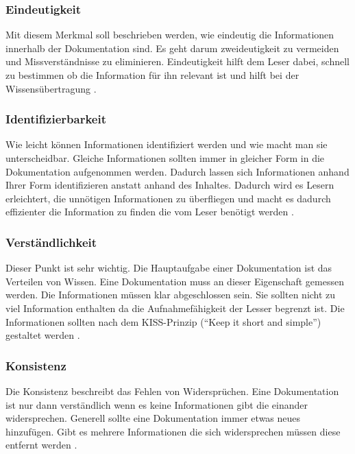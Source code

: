 \documentclass[a4paper,12pt]{scrartcl}
\begin{document}
\subsubsection{Eindeutigkeit}
Mit diesem Merkmal soll beschrieben werden, wie eindeutig die Informationen innerhalb der Dokumentation sind. Es geht darum zweideutigkeit zu vermeiden und Missverständnisse zu eliminieren. Eindeutigkeit hilft dem Leser dabei, schnell zu bestimmen ob die Information für ihn relevant ist und hilft bei der Wissensübertragung \cite{Prause2013}.

\subsubsection{Identifizierbarkeit}
Wie leicht können Informationen identifiziert werden und wie macht man sie unterscheidbar. Gleiche Informationen sollten immer in gleicher Form in die Dokumentation aufgenommen werden. Dadurch lassen sich Informationen anhand Ihrer Form identifizieren anstatt anhand des Inhaltes. Dadurch wird es Lesern erleichtert, die unnötigen Informationen zu überfliegen und macht es dadurch effizienter die Information zu finden die vom Leser benötigt werden \cite{Prause2013}.

\subsubsection{Verständlichkeit}
Dieser Punkt ist sehr wichtig. Die Hauptaufgabe einer Dokumentation ist das Verteilen von Wissen. Eine Dokumentation muss an dieser Eigenschaft gemessen werden. Die Informationen müssen klar abgeschlossen sein. Sie sollten nicht zu viel Information enthalten da die Aufnahmefähigkeit der Lesser begrenzt ist. Die Informationen sollten nach dem KISS-Prinzip (“Keep it short and simple”) gestaltet werden \cite{Prause2013}.

\subsubsection{Konsistenz}
Die Konsistenz beschreibt das Fehlen von Widersprüchen. Eine Dokumentation ist nur dann verständlich wenn es keine Informationen gibt die einander widersprechen. Generell sollte eine Dokumentation immer etwas neues hinzufügen. Gibt es mehrere Informationen die sich widersprechen müssen diese entfernt werden \cite{Prause2013}.
\end{document}
